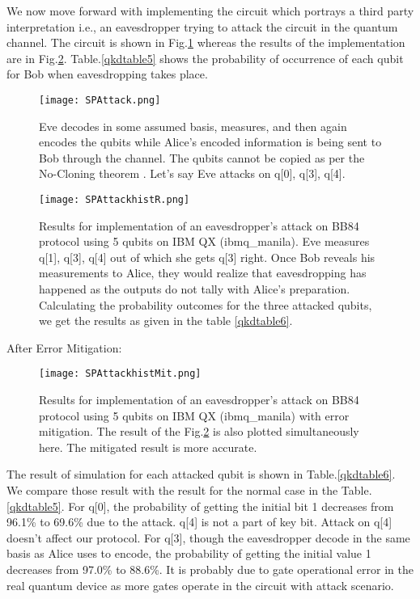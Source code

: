 \documentclass[superscriptaddress,twocolumn,showpacs,prb,floatfix]{revtex4}
\begin{document}
We now move forward with implementing the circuit which portrays a third party interpretation i.e., an eavesdropper trying to attack the circuit in the quantum channel. The circuit is shown in Fig.\ref{SPAttack} whereas the results of the implementation are in Fig.\ref{SPAttackhist}. Table.\ref{qkdtable5} shows the probability of occurrence of each qubit for Bob when eavesdropping takes place.
\begin{figure}[H]
    \centering
    \texttt{[image: SPAttack.png]}
    \caption{Eve decodes in some assumed basis, measures, and then again encodes the qubits while Alice's encoded information is being sent to Bob through the channel. The qubits cannot be copied as per the No-Cloning theorem \cite{qkd_WoottersNature1982}. Let's say Eve attacks on q[0], q[3], q[4].}
    \label{SPAttack}
\end{figure}
\begin{figure}[H]
    \centering
    \texttt{[image: SPAttackhistR.png]}
    \caption{Results for implementation of an eavesdropper's attack on BB84 protocol using 5 qubits on IBM QX (ibmq\_manila). Eve measures q[1], q[3], q[4] out of which she gets q[3] right. Once Bob reveals his measurements to Alice, they would realize that eavesdropping has happened as the outputs do not tally with Alice's preparation. Calculating the probability outcomes for the three attacked qubits, we get the results as given in the table \ref{qkdtable6}.}
    \label{SPAttackhist}
\end{figure}
After Error Mitigation: 
\begin{figure}[H]
    \centering
    \texttt{[image: SPAttackhistMit.png]}
    \caption{Results for implementation of an eavesdropper's attack on BB84 protocol using 5 qubits on IBM QX (ibmq\_manila) with error mitigation. The result of the Fig.\ref{SPAttackhist} is also plotted simultaneously here. The mitigated result is more accurate.}
    \label{SPAttackhistMit}
\end{figure}
The result of simulation for each attacked qubit is shown in Table.\ref{qkdtable6}. We compare those result with the result for the normal case in the Table.\ref{qkdtable5}. For q[0], the probability of getting the initial bit 1 decreases from 96.1\% to 69.6\% due to the attack. q[4] is not a part of key bit. Attack on q[4] doesn't affect our protocol. For q[3], though the eavesdropper decode in the same basis as Alice uses to encode, the probability of getting the initial value 1 decreases from 97.0\% to 88.6\%. It is probably due to gate operational error in the real quantum device as more gates operate in the circuit with attack scenario. 
\end{document}
